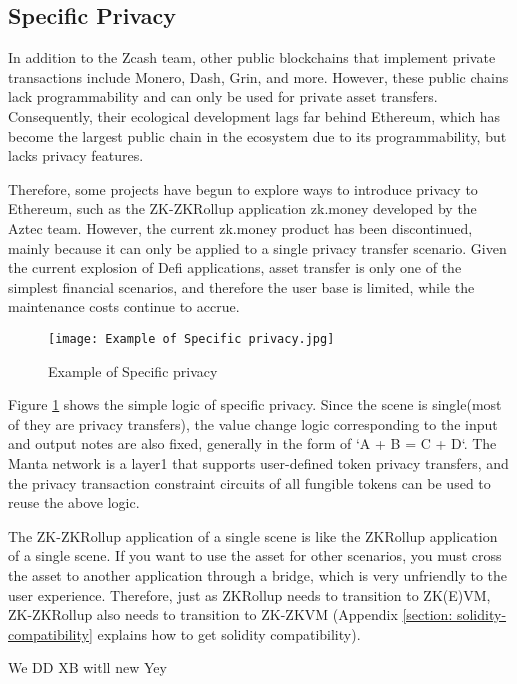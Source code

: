 \subsection{Specific Privacy}

In addition to the Zcash\cite{website:Zcash} team, other public blockchains that implement private transactions include Monero\cite{website:Monero}, Dash\cite{website:Dash}, Grin\cite{website:Grin}, and more. However, these public chains lack programmability and can only be used for private asset transfers. Consequently, their ecological development lags far behind Ethereum\cite{website:Ethereum}, which has become the largest public chain in the ecosystem due to its programmability, but lacks privacy features.

Therefore, some projects have begun to explore ways to introduce privacy to Ethereum\cite{website:Ethereum}, such as the ZK-ZKRollup application zk.money\cite{website:zk.money} developed by the Aztec\cite{website:Aztec} team. However, the current zk.money\cite{website:zk.money} product has been discontinued, mainly because it can only be applied to a single privacy transfer scenario. Given the current explosion of Defi applications, asset transfer is only one of the simplest financial scenarios, and therefore the user base is limited, while the maintenance costs continue to accrue.
\begin{figure}[!ht]
    \centering
    \texttt{[image: Example of Specific privacy.jpg]}
    \caption{Example of Specific privacy}
    \label{fig:Example of Specific privacy}
\end{figure}

Figure \ref{fig:Example of Specific privacy} shows the simple logic of specific privacy. Since the scene is single(most of 
they are privacy transfers), the value change logic corresponding to the input and output 
notes are also fixed, generally in the form of `A + B = C + D`. The Manta network\cite{website:Manta-network} is a 
layer1 that supports user-defined token privacy transfers, and the privacy transaction 
constraint circuits of all fungible tokens can be used to reuse the above logic.

The ZK-ZKRollup application of a single scene is like the ZKRollup application of a 
single scene. If you want to use the asset for 
other scenarios, you must cross the asset to another application through a bridge, 
which is very unfriendly to the user experience. Therefore, just as ZKRollup needs to 
transition to ZK(E)VM, ZK-ZKRollup also needs to transition to ZK-ZKVM (Appendix \ref{section: solidity-compatibility} explains 
how to get solidity compatibility).


We DD XB witll new Yey 